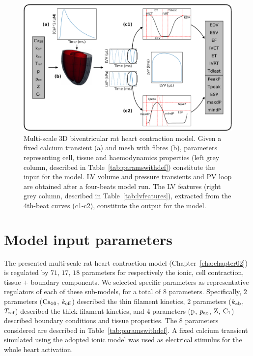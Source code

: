 \begin{figure}[!ht]
    \myfloatalign
    \includegraphics[width=\textwidth]{figures/chapter03/simulator_framework.pdf}
    \caption{Multi-scale $3$D biventricular rat heart contraction model. Given a fixed calcium transient (a) and mesh with fibres (b), parameters representing cell, tissue and haemodynamics properties (left grey column, described in Table~\ref{tab:paramswithdef}) constitute the input for the model. LV volume and pressure transients and PV loop are obtained after a four-beats model run. The LV features (right grey column, described in Table~\ref{tab:lvfeatures}), extracted from the $4$th-beat curves (c1-c2), constitute the output for the model.}
    \label{fig:simulatorframework}
\end{figure}


%
%
%
\section{Model input parameters}\label{sec:ch3modelinputparameters}
The presented multi-scale rat heart contraction model (Chapter~\ref{cha:chapter02}) is regulated by $71$, $17$, $18$ parameters for respectively the ionic, cell contraction, tissue $+$ boundary components. We selected specific parameters as representative regulators of each of these sub-models, for a total of $8$ parameters. Specifically, $2$ parameters ($\textrm{Ca}_{50}$, $k_{\textrm{off}}$) described the thin filament kinetics, $2$ parameters ($k_{\textrm{xb}}$, $T_{\textrm{ref}}$) described the thick filament kinetics, and $4$ parameters ($\textrm{p}$, $p_{\textrm{ao}}$, $\textrm{Z}$, $\textrm{C}_1$) described boundary conditions and tissue properties. The $8$ parameters considered are described in Table~\ref{tab:paramswithdef}. A fixed calcium transient simulated using the adopted ionic model was used as electrical stimulus for the whole heart activation.

